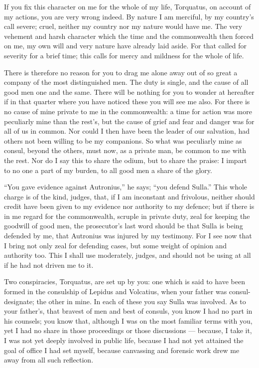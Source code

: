  If you fix this character on me for the whole of my life, Torquatus, on account of my actions, you are very wrong indeed. By nature I am merciful, by my country's call severe; cruel, neither my country nor my nature would have me. The very vehement and harsh character which the time and the commonwealth then forced on me, my own will and very nature have already laid aside. For that called for severity for a brief time; this calls for mercy and mildness for the whole of life.

 There is therefore no reason for you to drag me alone away out of so great a company of the most distinguished men. The duty is single, and the cause of all good men one and the same. There will be nothing for you to wonder at hereafter if in that quarter where you have noticed these you will see me also. For there is no cause of mine private to me in the commonwealth: a time for action was more peculiarly mine than the rest's, but the cause of grief and fear and danger was for all of us in common. Nor could I then have been the leader of our salvation, had others not been willing to be my companions. So what was peculiarly mine as consul, beyond the others, must now, as a private man, be common to me with the rest. Nor do I say this to share the odium, but to share the praise: I impart to no one a part of my burden, to all good men a share of the glory.

 ``You gave evidence against Autronius,'' he says; ``you defend Sulla.'' This whole charge is of the kind, judges, that, if I am inconstant and frivolous, neither should credit have been given to my evidence nor authority to my defence; but if there is in me regard for the commonwealth, scruple in private duty, zeal for keeping the goodwill of good men, the prosecutor's last word should be that Sulla is being defended by me, that Autronius was injured by my testimony. For I see now that I bring not only zeal for defending cases, but some weight of opinion and authority too. This I shall use moderately, judges, and should not be using at all if he had not driven me to it.

 Two conspiracies, Torquatus, are set up by you: one which is said to have been formed in the consulship of Lepidus and Volcatius, when your father was consul-designate; the other in mine. In each of these you say Sulla was involved. As to your father's, that bravest of men and best of consuls, you know I had no part in his counsels; you know that, although I was on the most familiar terms with you, yet I had no share in those proceedings or those discussions --- because, I take it, I was not yet deeply involved in public life, because I had not yet attained the goal of office I had set myself, because canvassing and forensic work drew me away from all such reflection.

